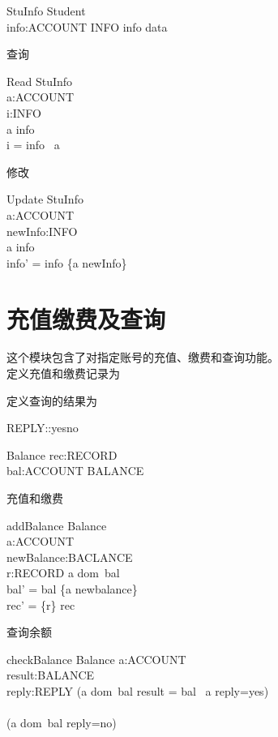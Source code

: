 \documentclass{article}
\begin{document}
\begin{CJK}{UTF8}{gbsn}
\begin{spacing}{1.4}
\begin{schema}{StuInfo}
\Xi Student\\
info:ACCOUNT \pfun INFO
\where 
\dom info \subseteq \dom data
\end{schema}

查询
\begin{schema}{Read}
\Xi StuInfo\\
a:ACCOUNT\\
i:INFO\\
\where 
a \in \dom info\\
i = info \ a 
\end{schema}

修改
\begin{schema}{Update}
\Xi StuInfo\\
a:ACCOUNT\\
newInfo:INFO\\
\where
a \in \dom info\\
info' = info \oplus \{a \mapsto newInfo\}
\end{schema}

\section{充值缴费及查询}
这个模块包含了对指定账号的充值、缴费和查询功能。\\
定义充值和缴费记录为
\begin{zed}[RECORD]\end{zed}
定义查询的结果为
\begin{zed}REPLY::yes\mid no\end{zed}
\begin{schema}{Balance}
rec:\seq RECORD\\
bal:ACCOUNT \pfun BALANCE\\
\end{schema}

充值和缴费
\begin{schema}{addBalance}
\Delta Balance\\
a:ACCOUNT\\
newBalance:BACLANCE\\
r:RECORD
\where
a \in dom\  bal\\
bal' = bal \oplus \{a \mapsto newbalance\}\\
rec' = \{r\} \cat rec\\
\end{schema}

查询余额
\begin{schema}{checkBalance}
\Xi Balance
a:ACCOUNT\\
result:BALANCE\\
reply:REPLY
\where
(a \in dom\  bal \land result = bal \  a \land reply=yes)\\
\lor\\
(a \notin dom\  bal  \land reply=no)\\
\end{schema}





\end{spacing}
\end{CJK}
\end{document}
